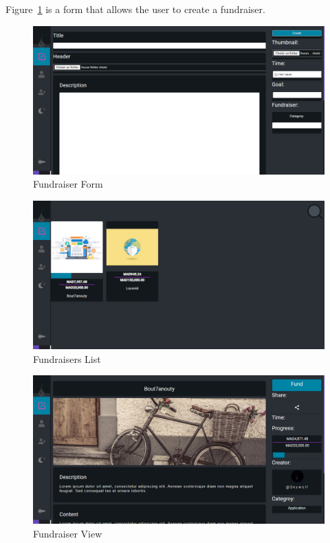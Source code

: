
Figure~\ref{fig:fundraiser form} is a form that allows the user to create a fundraiser.

\begin{figure}[H]
      \centering
      \includegraphics[scale=0.45]{assets/screen-fundraiser-creator.png}
      \caption{Fundraiser Form}
      \label{fig:fundraiser form}
\end{figure}




\begin{figure}[H]
      \centering
      \includegraphics[scale=0.45]{assets/screen-fundraisers-list.png}
      \caption{Fundraisers List}
      \label{fig:fundraisers list}
\end{figure}





\begin{figure}[H]
      \centering
      \includegraphics[scale=0.45]{assets/screen-fundraiser-view.png}
      \caption{Fundraiser View}
      \label{fig:fundraiser view}
\end{figure}




